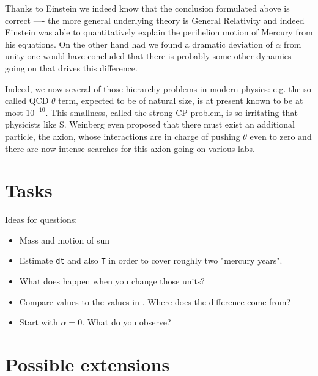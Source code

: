 \documentclass[12pt]{iopart}
\begin{document}
Thanks to Einstein we indeed know that the conclusion formulated above is correct ---- the more general underlying
theory is General Relativity and indeed Einstein was able to quantitatively explain the perihelion motion of Mercury
from his equations. 
On the other hand had we found a dramatic deviation of $\alpha$ from unity one would have concluded that 
there is probably some other dynamics going on that drives this difference.

Indeed, we now several of those hierarchy problems in modern physics: e.g. the so called QCD $\theta$ term,
expected to be of natural size, is at present known to be at most $10^{-10}$. This smallness, called the
strong CP problem, is so irritating that physicists like S. Weinberg even proposed that there must exist an
additional particle, the axion, whose interactions are in charge of pushing $\theta$ even to zero and there
are now intense searches for this axion going on various labs.



\section{Tasks}\label{sec:tasks}

Ideas for questions:
\begin{itemize}
	\item Mass and motion of sun
	\item Estimate \texttt{dt} and also \texttt{T} in order to cover roughly two "mercury years".
	\item What does happen when you change those units?
	\item Compare values to the values in \cite{}.  Where does the difference come from?
	\item Start with $\alpha=0$. What do you observe?
\end{itemize}



\section{Possible extensions}\label{sec:extensions}
\end{document}
